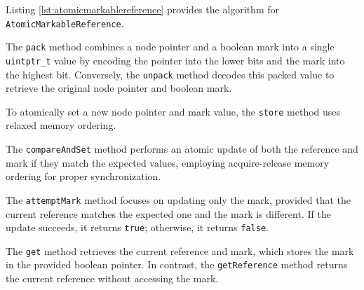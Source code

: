 Listing \ref{lst:atomicmarkablereference} provides the algorithm for \texttt{AtomicMarkableReference}.

The \texttt{pack} method combines a node pointer and a boolean mark into a single \texttt{uintptr\_t} value by encoding the pointer into the lower bits and the mark into the highest bit. Conversely, the \texttt{unpack} method decodes this packed value to retrieve the original node pointer and boolean mark.

To atomically set a new node pointer and mark value, the \texttt{store} method uses relaxed memory ordering.

The \texttt{compareAndSet} method performs an atomic update of both the reference and mark if they match the expected values, employing acquire-release memory ordering for proper synchronization.

The \texttt{attemptMark} method focuses on updating only the mark, provided that the current reference matches the expected one and the mark is different. If the update succeeds, it returns \texttt{true}; otherwise, it returns \texttt{false}.

The \texttt{get} method retrieves the current reference and mark, which stores the mark in the provided boolean pointer. In contrast, the \texttt{getReference} method returns the current reference without accessing the mark.

\begin{figure}[!p]
    \centering
    
\end{figure}
